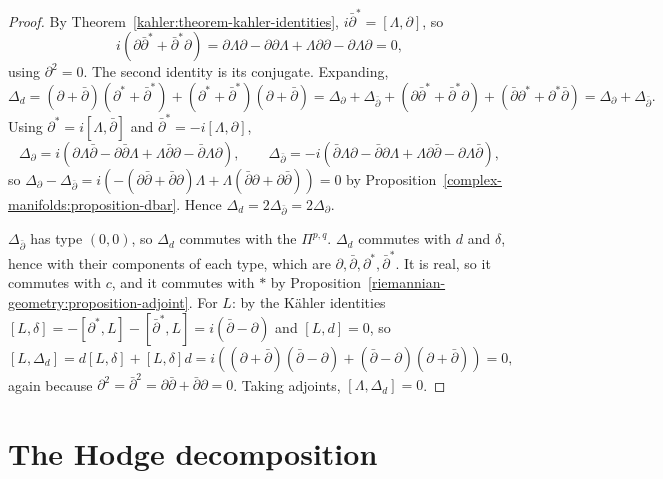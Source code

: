 \begin{proof}
By Theorem~\ref{kahler:theorem-kahler-identities}, $i\bar\partial^* = [\Lambda, \partial]$, so
\[
i(\partial\bar\partial^* + \bar\partial^*\partial) = \partial\Lambda\partial - \partial\partial\Lambda + \Lambda\partial\partial - \partial\Lambda\partial = 0,
\]
using $\partial^2 = 0$. The second identity is its conjugate. Expanding,
\[
\Delta_d = (\partial + \bar\partial)(\partial^* + \bar\partial^*) + (\partial^* + \bar\partial^*)(\partial + \bar\partial)
= \Delta_\partial + \Delta_{\bar\partial} + (\partial\bar\partial^* + \bar\partial^*\partial) + (\bar\partial\partial^* + \partial^*\bar\partial) = \Delta_\partial + \Delta_{\bar\partial}.
\]
Using $\partial^* = i[\Lambda, \bar\partial]$ and $\bar\partial^* = -i[\Lambda, \partial]$,
\[
\Delta_\partial = i(\partial\Lambda\bar\partial - \partial\bar\partial\Lambda + \Lambda\bar\partial\partial - \bar\partial\Lambda\partial), \qquad
\Delta_{\bar\partial} = -i(\bar\partial\Lambda\partial - \bar\partial\partial\Lambda + \Lambda\partial\bar\partial - \partial\Lambda\bar\partial),
\]
so $\Delta_\partial - \Delta_{\bar\partial} = i\left(-(\partial\bar\partial + \bar\partial\partial)\Lambda + \Lambda(\bar\partial\partial + \partial\bar\partial)\right) = 0$ by
Proposition~\ref{complex-manifolds:proposition-dbar}. Hence $\Delta_d = 2\Delta_{\bar\partial} = 2\Delta_\partial$.

$\Delta_{\bar\partial}$ has type $(0,0)$, so $\Delta_d$ commutes with the $\Pi^{p,q}$. $\Delta_d$ commutes with $d$ and $\delta$, hence with
their components of each type, which are $\partial, \bar\partial, \partial^*, \bar\partial^*$. It is real, so it commutes with $c$, and it
commutes with $*$ by Proposition~\ref{riemannian-geometry:proposition-adjoint}. For $L$: by the K\"ahler identities
$[L, \delta] = -[\partial^*, L] - [\bar\partial^*, L] = i(\bar\partial - \partial)$ and $[L, d] = 0$, so
\[
[L, \Delta_d] = d[L, \delta] + [L, \delta]d = i\left((\partial + \bar\partial)(\bar\partial - \partial) + (\bar\partial - \partial)(\partial + \bar\partial)\right) = 0,
\]
again because $\partial^2 = \bar\partial^2 = \partial\bar\partial + \bar\partial\partial = 0$. Taking adjoints, $[\Lambda, \Delta_d] = 0$.
\end{proof}

\section{The Hodge decomposition}\label{kahler:section-hodge-decomposition-theorem}

